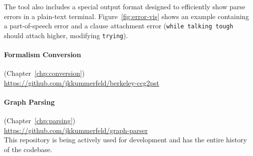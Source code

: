 The tool also includes a special output format designed to efficiently show parse errors in a plain-text terminal.
Figure~\ref{fig:error-vis} shows an example containing a part-of-speech error and a clause attachment error (\texttt{while talking tough} should attach higher, modifying \texttt{trying}).

\paragraph{Formalism Conversion} (Chapter~\ref{chp:conversion}) \\
\url{https://github.com/jkkummerfeld/berkeley-ccg2pst}

\paragraph{Graph Parsing} (Chapter~\ref{chp:parsing}) \\
\url{https://github.com/jkkummerfeld/graph-parser} \\
This repository is being actively used for development and has the entire history of the codebase.


